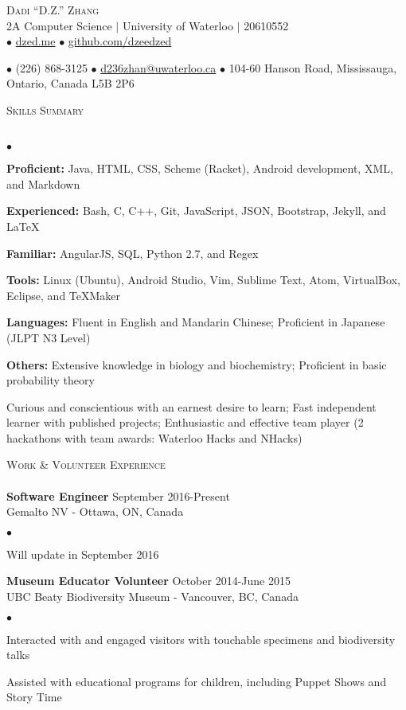 \documentclass{article}
\newcommand{\lineunder}{\vspace*{-8pt} \\ \hspace*{-18pt} \hrulefill \\}
\newcommand{\header}[1]{{\hspace*{-15pt}\vspace*{6pt} \textsc{#1}} \vspace*{-6pt} \lineunder}
\newcommand{\employer}[3]{{ \textbf{#1} \hfill #2\\ {#3}\\  }}
\newcommand{\contact}[3]{
\begin{center}
{}
\end{center}
\vspace*{-8pt}
\begin{center}
{\LARGE \scshape {#1}}\\
#2\\
#3
\end{center}
\vspace*{-8pt}
}
\newenvironment{achievements}{\begin{list}{$\bullet$}{\topsep 0pt \itemsep -2pt}}{\vspace*{4pt}\end{list}}
\begin{document}
\small
\smallskip
\vspace*{-88pt}

\contact{Dadi ``D.Z.'' Zhang}
{2A Computer Science $\vert$ University of Waterloo $\vert$ 20610552}
{$\bullet$ \href{http://dzed.me}{dzed.me}
$\bullet$ \href{http://github.com/dzeedzed}{github.com/dzeedzed}}
{$\bullet$ (226) 868-3125
$\bullet$ \href{mailto:d236zhan@uwaterloo.ca}{d236zhan@uwaterloo.ca}
$\bullet$ 104-60 Hanson Road, Mississauga, Ontario, Canada L5B 2P6}

\hfill \break
\header{Skills Summary}
\begin{achievements}
\item \textbf{Proficient:} Java, HTML, CSS, Scheme (Racket), Android development, XML, and Markdown
\item \textbf{Experienced:} Bash, C, C++, Git, JavaScript, JSON, Bootstrap, Jekyll, and  \LaTeX\
\item \textbf{Familiar:} AngularJS, SQL, Python 2.7, and Regex
\item \textbf{Tools:} Linux (Ubuntu), Android Studio, Vim, Sublime Text, Atom, VirtualBox, Eclipse, and TeXMaker
\item \textbf{Languages:} Fluent in English and Mandarin Chinese; Proficient in Japanese (JLPT N3 Level)
\item \textbf{Others:} Extensive knowledge in biology and biochemistry; Proficient in basic probability theory
\item Curious and conscientious with an earnest desire to learn; Fast independent learner with published projects; Enthusiastic and effective team player (2 hackathons with team awards: Waterloo Hacks and NHacks)
\end{achievements}

\header{Work \& Volunteer Experience}

\employer{Software Engineer}{September 2016-Present}{Gemalto NV - Ottawa, ON, Canada}
	\begin{achievements}
	\item Will update in September 2016
	\end{achievements}
\employer{Museum Educator Volunteer}{October 2014-June 2015}{UBC Beaty Biodiversity Museum - Vancouver, BC, Canada}
	\begin{achievements}
	\item Interacted with and engaged visitors with touchable specimens and biodiversity talks
	\item Assisted with educational programs for children, including Puppet Shows and Story Time 
	\end{achievements}
\end{document}

